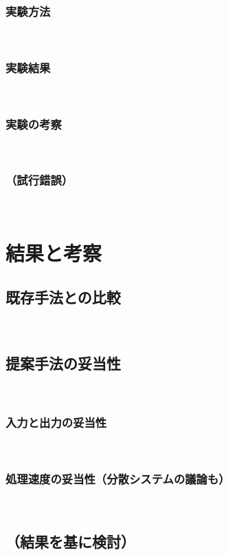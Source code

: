 \documentclass[12pt,a4j]{jreport}
\begin{document}
\subsection{実験方法}
~

\subsection{実験結果}
~

\subsection{実験の考察}
~

\subsection{（試行錯誤）}
~


\chapter{結果と考察}


\section{既存手法との比較}
~

\section{提案手法の妥当性}
~

\subsection{入力と出力の妥当性}
~

\subsection{処理速度の妥当性（分散システムの議論も）}
~

\section{（結果を基に検討）}
~
\end{document}

